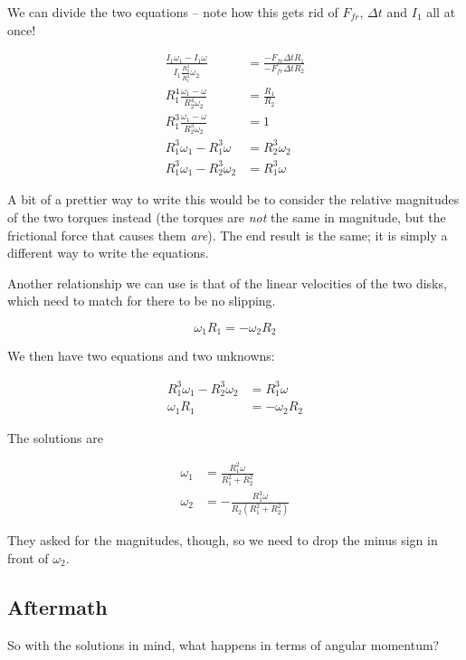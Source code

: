 \documentclass[8.01x]{subfiles}
\begin{document}
We can divide the two equations -- note how this gets rid of $F_{fr}$, $\Delta t$ and $I_1$ all at once!

\begin{align}
\frac{I_1 \omega_1 - I_1 \omega}{I_1 \frac{R_2^4}{R_1^4} \omega_2} &= \frac{- F_{fr} \Delta t R_1}{- F_{fr} \Delta t R_2}\\
R_1^4 \frac{\omega_1 - \omega}{R_2^4 \omega_2} &= \frac{R_1}{R_2}\\
R_1^3 \frac{\omega_1 - \omega}{R_2^3 \omega_2} &= 1\\
R_1^3 \omega_1 - R_1^3 \omega &= R_2^3 \omega_2\\
R_1^3 \omega_1 - R_2^3 \omega_2 &= R_1^3 \omega
\end{align}

A bit of a prettier way to write this would be to consider the relative magnitudes of the two torques instead (the torques are \emph{not} the same in magnitude, but the frictional force that causes them \emph{are}). The end result is the same; it is simply a different way to write the equations.

Another relationship we can use is that of the linear velocities of the two disks, which need to match for there to be no slipping.

\begin{equation}
\omega_1 R_1 = -\omega_2 R_2
\end{equation}

We then have two equations and two unknowns:

\begin{align}
R_1^3 \omega_1 - R_2^3 \omega_2 &= R_1^3 \omega\\
\omega_1 R_1 &= -\omega_2 R_2
\end{align}

The solutions are

\begin{align}
\omega_1 &= \frac{R_1^2 \omega}{R_1^2 + R_2^2}\\
\omega_2 &= -\frac{R_1^3 \omega}{R_2 (R_1^2 + R_2^2)}
\end{align}

They asked for the magnitudes, though, so we need to drop the minus sign in front of $\omega_2$.

\subsection{Aftermath}

So with the solutions in mind, what happens in terms of angular momentum?
\end{document}

